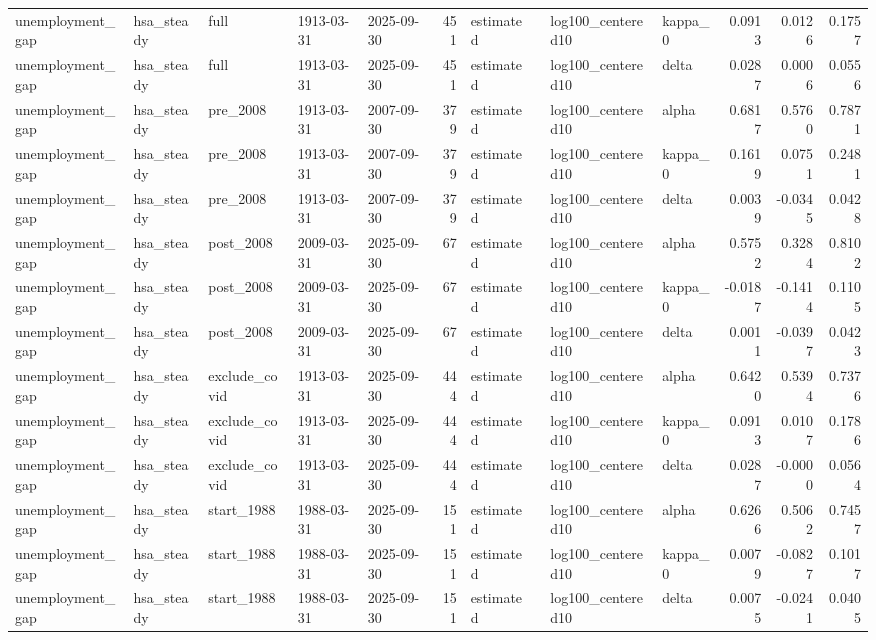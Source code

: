 \begin{tabular}{lllllrllllrrr}
unemployment\_gap & hsa\_steady & full & 1913-03-31 & 2025-09-30 & 451 & estimated &  & log100\_centered10 & kappa\_0 & 0.0913 & 0.0126 & 0.1757 \\
unemployment\_gap & hsa\_steady & full & 1913-03-31 & 2025-09-30 & 451 & estimated &  & log100\_centered10 & delta & 0.0287 & 0.0006 & 0.0556 \\
unemployment\_gap & hsa\_steady & pre\_2008 & 1913-03-31 & 2007-09-30 & 379 & estimated &  & log100\_centered10 & alpha & 0.6817 & 0.5760 & 0.7871 \\
unemployment\_gap & hsa\_steady & pre\_2008 & 1913-03-31 & 2007-09-30 & 379 & estimated &  & log100\_centered10 & kappa\_0 & 0.1619 & 0.0751 & 0.2481 \\
unemployment\_gap & hsa\_steady & pre\_2008 & 1913-03-31 & 2007-09-30 & 379 & estimated &  & log100\_centered10 & delta & 0.0039 & -0.0345 & 0.0428 \\
unemployment\_gap & hsa\_steady & post\_2008 & 2009-03-31 & 2025-09-30 & 67 & estimated &  & log100\_centered10 & alpha & 0.5752 & 0.3284 & 0.8102 \\
unemployment\_gap & hsa\_steady & post\_2008 & 2009-03-31 & 2025-09-30 & 67 & estimated &  & log100\_centered10 & kappa\_0 & -0.0187 & -0.1414 & 0.1105 \\
unemployment\_gap & hsa\_steady & post\_2008 & 2009-03-31 & 2025-09-30 & 67 & estimated &  & log100\_centered10 & delta & 0.0011 & -0.0397 & 0.0423 \\
unemployment\_gap & hsa\_steady & exclude\_covid & 1913-03-31 & 2025-09-30 & 444 & estimated &  & log100\_centered10 & alpha & 0.6420 & 0.5394 & 0.7376 \\
unemployment\_gap & hsa\_steady & exclude\_covid & 1913-03-31 & 2025-09-30 & 444 & estimated &  & log100\_centered10 & kappa\_0 & 0.0913 & 0.0107 & 0.1786 \\
unemployment\_gap & hsa\_steady & exclude\_covid & 1913-03-31 & 2025-09-30 & 444 & estimated &  & log100\_centered10 & delta & 0.0287 & -0.0000 & 0.0564 \\
unemployment\_gap & hsa\_steady & start\_1988 & 1988-03-31 & 2025-09-30 & 151 & estimated &  & log100\_centered10 & alpha & 0.6266 & 0.5062 & 0.7457 \\
unemployment\_gap & hsa\_steady & start\_1988 & 1988-03-31 & 2025-09-30 & 151 & estimated &  & log100\_centered10 & kappa\_0 & 0.0079 & -0.0827 & 0.1017 \\
unemployment\_gap & hsa\_steady & start\_1988 & 1988-03-31 & 2025-09-30 & 151 & estimated &  & log100\_centered10 & delta & 0.0075 & -0.0241 & 0.0405 \\

\end{tabular}
